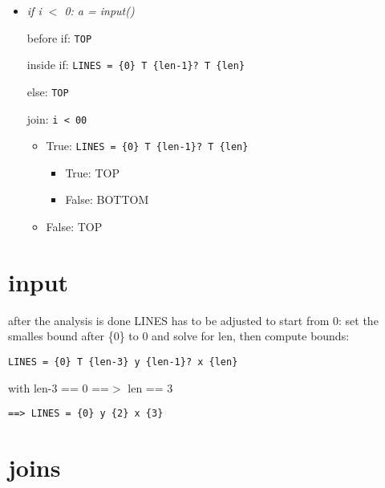 \documentclass[11pt]{article}
\begin{document}
\begin{itemize}
\item \textit{if i $<$ 0: a = input()}

before if: \verb|TOP|

inside if: \verb|LINES = {0} T {len-1}? T {len}|

else: \verb|TOP|

join: \verb|i < 00|
\begin{itemize}
\item True: \verb|LINES = {0} T {len-1}? T {len}|
\begin{itemize}
\item True: TOP
\item False: BOTTOM
\end{itemize}
\item False: TOP
\end{itemize}

\end{itemize}

\section{input}

after the analysis is done LINES has to be adjusted to start from 0: set the smalles bound after \{0\} to 0 and solve for len, then compute bounds:

\verb|LINES = {0} T {len-3} y {len-1}? x {len}|

with len-3 == 0 ==$>$ len == 3

\verb|==> LINES = {0} y {2} x {3}|

\section{joins}
\end{document}
